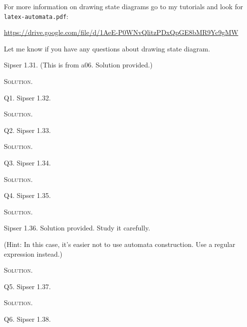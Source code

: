 For more information on drawing state diagrams go to my tutorials and
look for \verb!latex-automata.pdf!:
\begin{center}
{\small \url{https://drive.google.com/file/d/1AeE-P0WNvQlitzPDxQpGE8bMR9Yc9gMW}}
\end{center}
Let me know if you have any questions about drawing state diagram.

\newpage
Sipser 1.31. (This is from a06. Solution provided.) 

\textsc{Solution}.



\newpage
Q1. Sipser 1.32.

\textsc{Solution}.



\newpage
Q2. Sipser 1.33.

\textsc{Solution}.



\newpage
Q3. Sipser 1.34.

\textsc{Solution}.



\newpage
Q4. Sipser 1.35.

\textsc{Solution}.



\newpage
Sipser 1.36. Solution provided. Study it carefully.

(Hint: In this case, it's easier not to use automata construction.
Use a regular expression instead.)

\textsc{Solution}.
 


\newpage
Q5. Sipser 1.37.

\textsc{Solution}.



\newpage
Q6. Sipser 1.38.

